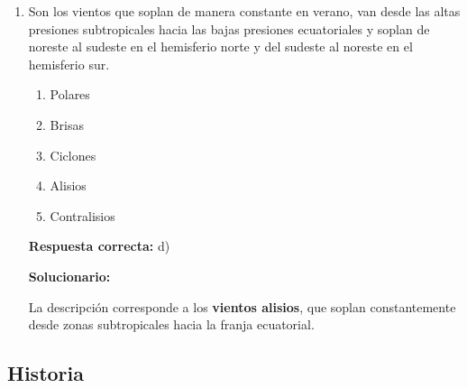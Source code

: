 \begin{enumerate}[resume]
	\vspace{2mm}
	\textbf{Solucionario:}
	
	El río formado por los ríos Lampa y Cabanillas es el \textbf{Coata}, que desemboca en la parte norte de la bahía de Chucuito.
	
	
	
	\vspace{6mm}
	
	\item Son los vientos que soplan de manera constante en verano, van desde las altas presiones subtropicales hacia las bajas presiones ecuatoriales y soplan de noreste al sudeste en el hemisferio norte y del sudeste al noreste en el hemisferio sur.
	\begin{enumerate}[label=\alph*)]
		\item Polares
		\item Brisas
		\item Ciclones
		\item Alisios
		\item Contralisios
	\end{enumerate}
	\textbf{Respuesta correcta:} d)
	
	\vspace{2mm}
	\textbf{Solucionario:}
	
	La descripción corresponde a los \textbf{vientos alisios}, que soplan constantemente desde zonas subtropicales hacia la franja ecuatorial.
	

	
	\vspace{6mm}
\end{enumerate}

\subsection*{Historia}

